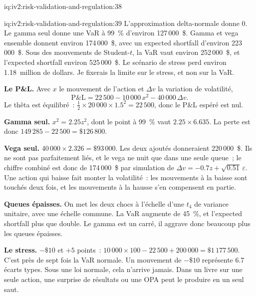 \begin{solution}{iq:iv2:risk-validation-and-regulation:38}
\end{solution}

\begin{solution}{iq:iv2:risk-validation-and-regulation:39}
L'approximation delta-normale donne 0. Le gamma seul donne une VaR à 99~\% d'environ 127\,000~\$. Gamma et vega ensemble donnent environ 174\,000~\$, avec un expected shortfall d'environ 223\,000~\$. Sous des mouvements de Student-$t$, la VaR vaut environ 252\,000~\$, et l'expected shortfall environ 525\,000~\$. Le scénario de stress perd environ 1.18~million de dollars. Je fixerais la limite sur le stress, et non sur la VaR.

\textbf{Le P\&L.} Avec $x$ le mouvement de l'action et $\Delta v$ la variation de volatilité,
\[
\mathrm{P\&L} = 22\,500 - 10\,000\,x^2 - 40\,000\,\Delta v.
\]
Le thêta est équilibré~: $\tfrac12 \times 20\,000 \times 1.5^2 = 22\,500$, donc le P\&L espéré est nul.

\textbf{Gamma seul.} $x^2 = 2.25 z^2$, dont le point à 99~\% vaut $2.25 \times 6.635$. La perte est donc $149\,285 - 22\,500 = \$126\,800$.

\textbf{Vega seul.} $40\,000 \times 2.326 = \$93\,000$. Les deux ajoutés donneraient 220\,000~\$. Ils ne sont pas parfaitement liés, et le vega ne nuit que dans une seule queue~; le chiffre combiné est donc de 174\,000~\$ par simulation de $\Delta v = -0.7 z + \sqrt{0.51}\,\varepsilon$. Une action qui baisse fait monter la volatilité~: les mouvements à la baisse sont touchés deux fois, et les mouvements à la hausse s'en compensent en partie.

\textbf{Queues épaisses.} On met les deux chocs à l'échelle d'une $t_4$ de variance unitaire, avec une échelle commune. La VaR augmente de 45~\%, et l'expected shortfall plus que double. Le gamma est un carré, il aggrave donc beaucoup plus les queues épaisses.

\textbf{Le stress.} $-\$10$ et $+5$ points~: $10\,000 \times 100 - 22\,500 + 200\,000 = \$1\,177\,500$. C'est près de sept fois la VaR normale. Un mouvement de $-\$10$ représente 6.7 écarts types. Sous une loi normale, cela n'arrive jamais. Dans un livre sur une seule action, une surprise de résultats ou une OPA peut le produire en un seul saut.


\end{solution}
